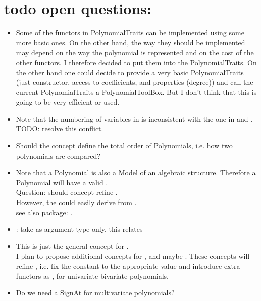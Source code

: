 


\section{todo open questions:}

\begin{itemize} 
\item Some of the functors in PolynomialTraits can be implemented using some more basic ones. 
      On the other hand, the way they should be implemented may depend on  the way the polynomial is 
      represented and on the cost of the other functors. 
      I therefore decided to put them into the PolynomialTraits. 
      On the other hand one could decide to provide a very basic PolynomialTraits 
      (just constructor, access to coefficients, and properties (degree)) and call the current 
      PolynomialTraits a PolynomialToolBox. But I don't think that this is going to be very efficient 
      or used. 

\item Note that the numbering of variables in  is inconsistent
      with the one in  and . \\
      TODO: resolve this conflict. 

\item Should the concept define the total order of Polynomials, i.e. how two polynomials are compared? 

\item Note that a Polynomial is also a Model of an algebraic structure. Therefore a Polynomial will have a
       valid . \\
      Question: should concept  refine .\\
      However, the  could easily derive from .\\
      see also package: . 

\item {}: take  as argument type only.
      this relates  

\item This is just the general concept for .  \\
      I plan to propose additional concepts for , and maybe .     
      These concepts will refine , i.e. fix the constant  to the appropriate value 
      and introduce extra functors as , for univariate bivariate polynomials. 

\item Do we need a SignAt for multivariate polynomials?

\end{itemize}


